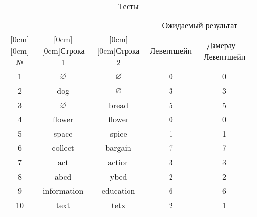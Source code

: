\begin{table}[H]
	\caption{\label{table:tests} Тесты}
	\begin{center}
		\begin{tabular}{|c|c|c|c|c|}
			\hline
			 &  &  & \multicolumn{2}{c|}{Ожидаемый результат} \\
			\cline{4-5}
			\raisebox{1.5ex}[0cm][0cm]{№} & \raisebox{1.5ex}[0cm][0cm]{Строка 1} & \raisebox{1.5ex}[0cm][0cm]{Строка 2} 
			&  Левентшейн & Дамерау -- Левентшейн \\ \hline
			1 & $\varnothing$ & $\varnothing$ & 0 & 0 \\ \hline
			2 & dog & $\varnothing$ & 3 & 3 \\ \hline
			3 & $\varnothing$ & bread & 5 & 5 \\ \hline
			4 & flower & flower & 0 & 0 \\ \hline
			5 & space & spice & 1 & 1 \\ \hline
			6 & collect & bargain & 7 & 7 \\ \hline
			7 & act & action & 3 & 3 \\ \hline
			8 & abcd & ybed & 2 & 2 \\ \hline
			9 & information & education & 6 & 6 \\ \hline
			10 & text & tetx & 2 & 1 \\ \hline
			

		\end{tabular}
	\end{center}
\end{table}